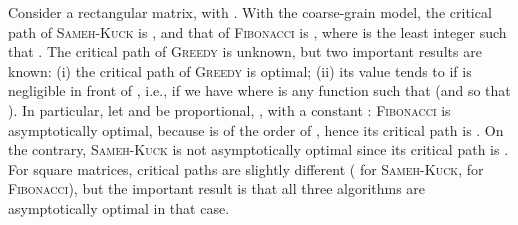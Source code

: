 \documentclass[a4paper,twopages]{article}
\newcommand{\SK}{\textsc{Sameh-Kuck}\xspace}
\newcommand{\MC}{\textsc{Fibonacci}\xspace}
\newcommand{\Greedy}{\textsc{Greedy}\xspace}
\begin{document}
Consider a rectangular  matrix, with .  With the coarse-grain
model, the critical path of \SK is , and that of \MC is ,
where  is the least integer such that .  The critical
path of \Greedy is unknown, but two important results are known: (i) the
critical path of \Greedy is optimal; (ii) its value tends to  if  is
negligible in front of , i.e., if we have  where  is any
function such that  (and  so that ).
In particular, let  and  be proportional, , with a
constant : \MC is asymptotically optimal, because  is of the
order of , hence its critical path is . On the contrary,
\SK is not asymptotically optimal since its critical path is .  For square  matrices, critical paths are slightly different
( for \SK,  for \MC), but the important result is that all three
algorithms are asymptotically optimal in that case.





\begin{algorithm}[h]
\scriptsize{
   \DontPrintSemicolon


}
\caption{\Greedy algorithm via \emph{TT} kernels.}
\label{alg.tiled-greedy}
\end{algorithm}
\end{document}
